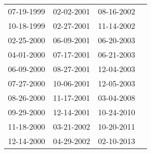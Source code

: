 \begin{supertabular}{llll}
 07-19-1999 &  02-02-2001 &  08-16-2002 \\
 10-18-1999 &  02-27-2001 &  11-14-2002 \\
 02-25-2000 &  06-09-2001 &  06-20-2003 \\
 04-01-2000 &  07-17-2001 &  06-21-2003 \\
 06-09-2000 &  08-27-2001 &  12-04-2003 \\
 07-27-2000 &  10-06-2001 &  12-05-2003 \\
 08-26-2000 &  11-17-2001 &  03-04-2008 \\
 09-29-2000 &  12-14-2001 &  10-24-2010 \\
 11-18-2000 &  03-21-2002 &  10-20-2011 \\
 12-14-2000 &  04-29-2002 &  02-10-2013 \\
\end{supertabular}
